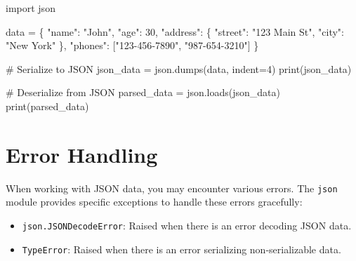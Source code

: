 \documentclass[
  letterpaper,
  DIV=11,
  numbers=noendperiod]{scrreprt}
\newenvironment{Shaded}{\begin{snugshade}}{\end{snugshade}}
\newcommand{\BuiltInTok}[1]{\textcolor[rgb]{0.00,0.23,0.31}{#1}}
\newcommand{\CommentTok}[1]{\textcolor[rgb]{0.37,0.37,0.37}{#1}}
\newcommand{\DecValTok}[1]{\textcolor[rgb]{0.68,0.00,0.00}{#1}}
\newcommand{\ImportTok}[1]{\textcolor[rgb]{0.00,0.46,0.62}{#1}}
\newcommand{\NormalTok}[1]{\textcolor[rgb]{0.00,0.23,0.31}{#1}}
\newcommand{\OperatorTok}[1]{\textcolor[rgb]{0.37,0.37,0.37}{#1}}
\newcommand{\StringTok}[1]{\textcolor[rgb]{0.13,0.47,0.30}{#1}}
\providecommand{\tightlist}{%
  \setlength{\itemsep}{0pt}\setlength{\parskip}{0pt}}\usepackage{longtable,booktabs,array}
\begin{document}
\begin{Shaded}
\begin{Highlighting}[]
\ImportTok{import}\NormalTok{ json}

\NormalTok{data }\OperatorTok{=}\NormalTok{ \{}
    \StringTok{"name"}\NormalTok{: }\StringTok{"John"}\NormalTok{,}
    \StringTok{"age"}\NormalTok{: }\DecValTok{30}\NormalTok{,}
    \StringTok{"address"}\NormalTok{: \{}
        \StringTok{"street"}\NormalTok{: }\StringTok{"123 Main St"}\NormalTok{,}
        \StringTok{"city"}\NormalTok{: }\StringTok{"New York"}
\NormalTok{    \},}
    \StringTok{"phones"}\NormalTok{: [}\StringTok{"123{-}456{-}7890"}\NormalTok{, }\StringTok{"987{-}654{-}3210"}\NormalTok{]}
\NormalTok{\}}

\CommentTok{\# Serialize to JSON}
\NormalTok{json\_data }\OperatorTok{=}\NormalTok{ json.dumps(data, indent}\OperatorTok{=}\DecValTok{4}\NormalTok{)}
\BuiltInTok{print}\NormalTok{(json\_data)}

\CommentTok{\# Deserialize from JSON}
\NormalTok{parsed\_data }\OperatorTok{=}\NormalTok{ json.loads(json\_data)}
\BuiltInTok{print}\NormalTok{(parsed\_data)}
\end{Highlighting}
\end{Shaded}

\section{Error Handling}\label{error-handling-2}

When working with JSON data, you may encounter various errors. The
\texttt{json} module provides specific exceptions to handle these errors
gracefully:

\begin{itemize}
\tightlist
\item
  \texttt{json.JSONDecodeError}: Raised when there is an error decoding
  JSON data.
\item
  \texttt{TypeError}: Raised when there is an error serializing
  non-serializable data.
\end{itemize}
\end{document}
